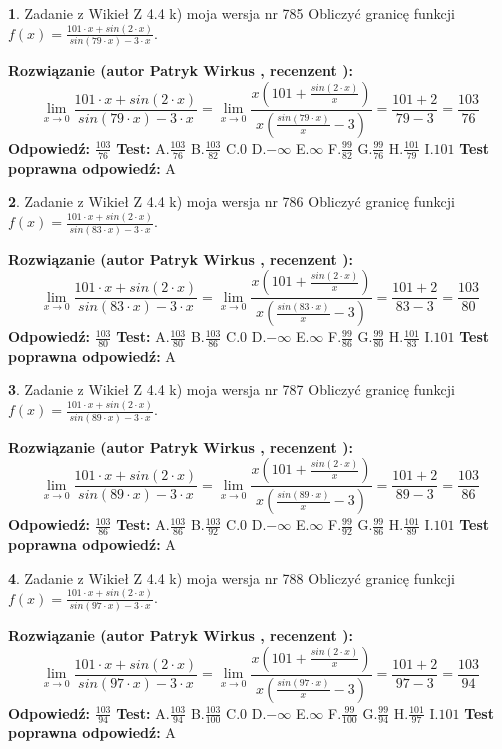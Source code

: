 \documentclass[12pt, a4paper]{article}
\theoremstyle{definition} %
\newtheorem{zad}{}
\newcommand{\zadStart}[1]{\begin{zad}#1\newline}
\newcommand{\zadStop}{\end{zad}}
\newcommand{\rozwStart}[2]{\noindent \textbf{Rozwiązanie (autor #1 , recenzent #2): }\newline}
\newcommand{\rozwStop}{\newline}
\newcommand{\odpStart}{\noindent \textbf{Odpowiedź:}\newline}
\newcommand{\odpStop}{\newline}
\newcommand{\testStart}{\noindent \textbf{Test:}\newline}
\newcommand{\testStop}{\newline}
\newcommand{\kluczStart}{\noindent \textbf{Test poprawna odpowiedź:}\newline}
\newcommand{\kluczStop}{\newline}
\begin{document}
\zadStart{Zadanie z Wikieł Z 4.4 k) moja wersja nr 785}
Obliczyć granicę funkcji $f(x)=\frac{101\cdot x +sin(2\cdot x)}{sin(79\cdot x) -3\cdot x}$.
\zadStop
\rozwStart{Patryk Wirkus}{}
$$\lim\limits_{x\to 0}\frac{101\cdot x +sin(2\cdot x)}{sin(79\cdot x) -3\cdot x}
=\lim\limits_{x\to 0}\frac{x(101+\frac{sin(2\cdot x)}{x})}{x(\frac{sin(79\cdot x)}{x}-3)}
=\frac{101+2}{79-3} = \frac{103}{76}$$
\rozwStop
\odpStart
$\frac{103}{76}$
\odpStop
\testStart
A.$\frac{103}{76}$
B.$\frac{103}{82}$
C.$0$
D.$-\infty$
E.$\infty$
F.$\frac{99}{82}$
G.$\frac{99}{76}$
H.$\frac{101}{79}$
I.$101$
\testStop
\kluczStart
A
\kluczStop



\zadStart{Zadanie z Wikieł Z 4.4 k) moja wersja nr 786}
Obliczyć granicę funkcji $f(x)=\frac{101\cdot x +sin(2\cdot x)}{sin(83\cdot x) -3\cdot x}$.
\zadStop
\rozwStart{Patryk Wirkus}{}
$$\lim\limits_{x\to 0}\frac{101\cdot x +sin(2\cdot x)}{sin(83\cdot x) -3\cdot x}
=\lim\limits_{x\to 0}\frac{x(101+\frac{sin(2\cdot x)}{x})}{x(\frac{sin(83\cdot x)}{x}-3)}
=\frac{101+2}{83-3} = \frac{103}{80}$$
\rozwStop
\odpStart
$\frac{103}{80}$
\odpStop
\testStart
A.$\frac{103}{80}$
B.$\frac{103}{86}$
C.$0$
D.$-\infty$
E.$\infty$
F.$\frac{99}{86}$
G.$\frac{99}{80}$
H.$\frac{101}{83}$
I.$101$
\testStop
\kluczStart
A
\kluczStop



\zadStart{Zadanie z Wikieł Z 4.4 k) moja wersja nr 787}
Obliczyć granicę funkcji $f(x)=\frac{101\cdot x +sin(2\cdot x)}{sin(89\cdot x) -3\cdot x}$.
\zadStop
\rozwStart{Patryk Wirkus}{}
$$\lim\limits_{x\to 0}\frac{101\cdot x +sin(2\cdot x)}{sin(89\cdot x) -3\cdot x}
=\lim\limits_{x\to 0}\frac{x(101+\frac{sin(2\cdot x)}{x})}{x(\frac{sin(89\cdot x)}{x}-3)}
=\frac{101+2}{89-3} = \frac{103}{86}$$
\rozwStop
\odpStart
$\frac{103}{86}$
\odpStop
\testStart
A.$\frac{103}{86}$
B.$\frac{103}{92}$
C.$0$
D.$-\infty$
E.$\infty$
F.$\frac{99}{92}$
G.$\frac{99}{86}$
H.$\frac{101}{89}$
I.$101$
\testStop
\kluczStart
A
\kluczStop



\zadStart{Zadanie z Wikieł Z 4.4 k) moja wersja nr 788}
Obliczyć granicę funkcji $f(x)=\frac{101\cdot x +sin(2\cdot x)}{sin(97\cdot x) -3\cdot x}$.
\zadStop
\rozwStart{Patryk Wirkus}{}
$$\lim\limits_{x\to 0}\frac{101\cdot x +sin(2\cdot x)}{sin(97\cdot x) -3\cdot x}
=\lim\limits_{x\to 0}\frac{x(101+\frac{sin(2\cdot x)}{x})}{x(\frac{sin(97\cdot x)}{x}-3)}
=\frac{101+2}{97-3} = \frac{103}{94}$$
\rozwStop
\odpStart
$\frac{103}{94}$
\odpStop
\testStart
A.$\frac{103}{94}$
B.$\frac{103}{100}$
C.$0$
D.$-\infty$
E.$\infty$
F.$\frac{99}{100}$
G.$\frac{99}{94}$
H.$\frac{101}{97}$
I.$101$
\testStop
\kluczStart
A
\kluczStop
\end{document}
